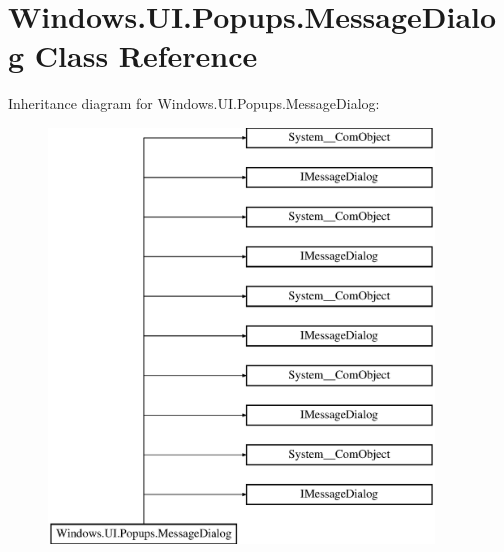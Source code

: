 \hypertarget{class_windows_1_1_u_i_1_1_popups_1_1_message_dialog}{}\section{Windows.\+U\+I.\+Popups.\+Message\+Dialog Class Reference}
\label{class_windows_1_1_u_i_1_1_popups_1_1_message_dialog}
Inheritance diagram for Windows.\+U\+I.\+Popups.\+Message\+Dialog\+:\begin{figure}[H]
\begin{center}
\leavevmode
\includegraphics[height=11.000000cm]{class_windows_1_1_u_i_1_1_popups_1_1_message_dialog}
\end{center}
\end{figure}
